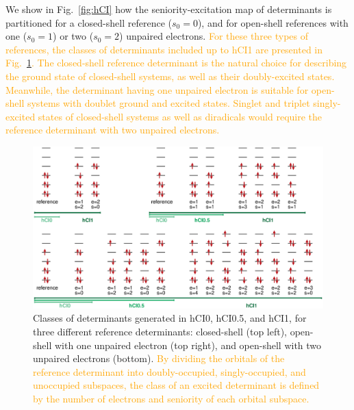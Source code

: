 \documentclass[aip,jcp,reprint,noshowkeys,superscriptaddress]{revtex4-1}
\newcommand{\fk}[1]{\textcolor{orange}{#1}}
\newcommand{\titou}[1]{\textcolor{red}{#1}}
\begin{document}
We show in Fig.~\ref{fig:hCI} how the seniority-excitation map of determinants is partitioned for a closed-shell reference ($s_0 = 0$), and for open-shell references with one ($s_0 = 1$) or two ($s_0 = 2$) unpaired electrons.
\fk{For these three types of references, the classes of determinants included up to hCI1 are presented in Fig.~\ref{fig:determinants}.
The closed-shell reference determinant is the natural choice for describing the ground state of closed-shell systems, as well as their doubly-excited states. \cite{Barca_2018,Lee_2019,Hait_2020,Kossoski_2021,Marie_2021,Kossoski_2023}
Meanwhile, the determinant having one unpaired electron is suitable for open-shell systems with doublet ground and excited states.
Singlet and triplet singly-excited states of closed-shell systems as well as diradicals \cite{Krylov_2006,Horbatenko_2021,Monino_2022} would require
the reference determinant with two unpaired electrons.}

\begin{figure}%
\includegraphics[width=1.0\linewidth]{determinants}
\caption{Classes of determinants generated in hCI0, hCI0.5, and hCI1, for three different reference determinants:
closed-shell (top left), open-shell with one unpaired electron (top right), and open-shell with two unpaired electrons (bottom).
\fk{By dividing the orbitals of the reference determinant into doubly-occupied, singly-occupied, and unoccupied subspaces,
the class of an excited determinant is defined by the number of electrons and seniority of each orbital subspace.}}
\label{fig:determinants}
\end{figure}
\end{document}
